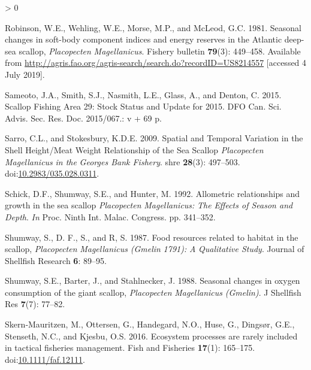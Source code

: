 \documentclass[
]{article}
\newlength{\cslhangindent}
\newenvironment{CSLReferences}[2] %
 {%
  \setlength{\parindent}{0pt}
  \ifodd #1 \everypar{\setlength{\hangindent}{\cslhangindent}}\ignorespaces\fi
  \ifnum #2 > 0
  \setlength{\parskip}{#2\baselineskip}
  \fi
 }%
 {}
\begin{document}
\begin{CSLReferences}{1}{0}
\leavevmode\hypertarget{ref-robinsonSeasonalChangesSoftbody1981}{}%
Robinson, W.E., Wehling, W.E., Morse, M.P., and McLeod, G.C. 1981. Seasonal changes in soft-body component indices and energy reserves in the {Atlantic} deep-sea scallop, {\emph{Placopecten}}{ \emph{Magellanicus}}{\emph{\emph{}}}. Fishery bulletin \textbf{79}(3): 449--458. Available from \url{http://agris.fao.org/agris-search/search.do?recordID=US8214557} {[}accessed 4 July 2019{]}.

\leavevmode\hypertarget{ref-sameotoScallopFishingArea2015}{}%
Sameoto, J.A., Smith, S.J., Nasmith, L.E., Glass, A., and Denton, C. 2015. Scallop {Fishing Area} 29: {Stock Status} and {Update} for 2015. DFO Can. Sci. Advis. Sec. Res. Doc. 2015/067.: v + 69 p.

\leavevmode\hypertarget{ref-sarroSpatialTemporalVariation2009}{}%
Sarro, C.L., and Stokesbury, K.D.E. 2009. Spatial and {Temporal Variation} in the {Shell Height}/{Meat Weight Relationship} of the {Sea Scallop} {\emph{Placopecten}}{ \emph{Magellanicus}}{ \emph{\emph{in the}} }{\emph{\emph{Georges Bank Fishery}}}. shre \textbf{28}(3): 497--503. doi:\href{https://doi.org/10.2983/035.028.0311}{10.2983/035.028.0311}.

\leavevmode\hypertarget{ref-schickAllometricRelationshipsGrowth1992a}{}%
Schick, D.F., Shumway, S.E., and Hunter, M. 1992. Allometric relationships and growth in the sea scallop {\emph{Placopecten}}{ \emph{Magellanicus}}{\emph{\emph{:}} }{\emph{\emph{The}}}{ \emph{\emph{Effects of Season and Depth}}}. \emph{In} Proc. {Ninth Int}. {Malac}. {Congress}. pp. 341--352.

\leavevmode\hypertarget{ref-shumwayFoodResourcesRelated1987}{}%
Shumway, S., D. F., S., and R, S. 1987. Food resources related to habitat in the scallop, {\emph{Placopecten}}{ \emph{Magellanicus}}{ \emph{\emph{(}}}{\emph{\emph{Gmelin}}}{ \emph{\emph{1791):}} }{\emph{\emph{A}}}{ \emph{\emph{Qualitative Study}}}. Journal of Shellfish Research \textbf{6}: 89--95.

\leavevmode\hypertarget{ref-shumwaySeasonalChangesOxygen1988}{}%
Shumway, S.E., Barter, J., and Stahlnecker, J. 1988. Seasonal changes in oxygen consumption of the giant scallop, {\emph{Placopecten}}{ \emph{Magellanicus}}{ \emph{\emph{(}}}{\emph{\emph{Gmelin}}}{\emph{\emph{)}}}. J Shellfish Res \textbf{7}(7): 77--82.

\leavevmode\hypertarget{ref-skern-mauritzenEcosystemProcessesAre2016}{}%
Skern‐Mauritzen, M., Ottersen, G., Handegard, N.O., Huse, G., Dingsør, G.E., Stenseth, N.C., and Kjesbu, O.S. 2016. Ecosystem processes are rarely included in tactical fisheries management. Fish and Fisheries \textbf{17}(1): 165--175. doi:\href{https://doi.org/10.1111/faf.12111}{10.1111/faf.12111}.


\end{CSLReferences}
\end{document}
